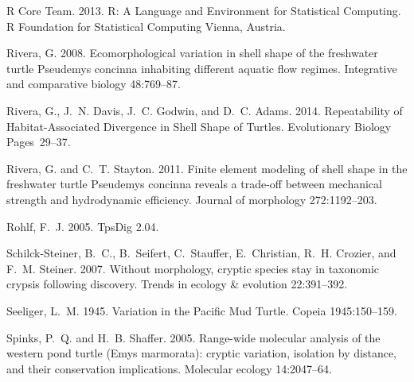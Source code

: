 \documentclass[12pt,letterpaper]{article}
\begin{document}
\begin{thebibliography}{77}
        {R Core Team}. 2013. R: A Language and Environment for Statistical Computing. R
        Foundation for Statistical Computing Vienna, Austria.

        Rivera, G. 2008. {Ecomorphological variation in shell shape of the freshwater
        turtle Pseudemys concinna inhabiting different aquatic flow regimes.}
        Integrative and comparative biology 48:769--87.

        Rivera, G., J.~N. Davis, J.~C. Godwin, and D.~C. Adams. 2014. {Repeatability of
        Habitat-Associated Divergence in Shell Shape of Turtles}. Evolutionary
        Biology Pages~29--37.

        Rivera, G. and C.~T. Stayton. 2011. {Finite element modeling of shell shape in
          the freshwater turtle Pseudemys concinna reveals a trade-off between
        mechanical strength and hydrodynamic efficiency.} Journal of morphology
        272:1192--203.

        Rohlf, F.~J. 2005. {TpsDig 2.04}.

        Schilck-Steiner, B.~C., B.~Seifert, C.~Stauffer, E.~Christian, R.~H. Crozier,
        and F.~M. Steiner. 2007. {Without morphology, cryptic species stay in
        taxonomic crypsis following discovery}. Trends in ecology \& evolution
        22:391--392.

        Seeliger, L.~M. 1945. {Variation in the Pacific Mud Turtle}. Copeia
        1945:150--159.

        Spinks, P.~Q. and H.~B. Shaffer. 2005. {Range-wide molecular analysis of the
          western pond turtle (Emys marmorata): cryptic variation, isolation by
        distance, and their conservation implications.} Molecular ecology
        14:2047--64.


\end{thebibliography}
\end{document}
